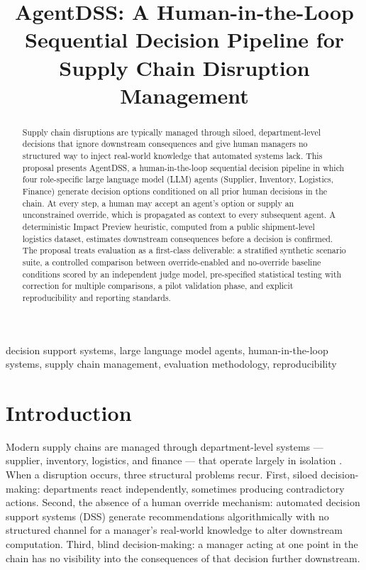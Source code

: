 \documentclass[conference]{IEEEtran}
\begin{document}
\title{AgentDSS: A Human-in-the-Loop Sequential Decision Pipeline for Supply Chain Disruption Management}

\author{}

\maketitle

\begin{abstract}
Supply chain disruptions are typically managed through siloed, department-level decisions that ignore downstream consequences and give human managers no structured way to inject real-world knowledge that automated systems lack. This proposal presents AgentDSS, a human-in-the-loop sequential decision pipeline in which four role-specific large language model (LLM) agents (Supplier, Inventory, Logistics, Finance) generate decision options conditioned on all prior human decisions in the chain. At every step, a human may accept an agent's option or supply an unconstrained override, which is propagated as context to every subsequent agent. A deterministic Impact Preview heuristic, computed from a public shipment-level logistics dataset, estimates downstream consequences before a decision is confirmed. The proposal treats evaluation as a first-class deliverable: a stratified synthetic scenario suite, a controlled comparison between override-enabled and no-override baseline conditions scored by an independent judge model, pre-specified statistical testing with correction for multiple comparisons, a pilot validation phase, and explicit reproducibility and reporting standards.
\end{abstract}

\begin{IEEEkeywords}
decision support systems, large language model agents, human-in-the-loop systems, supply chain management, evaluation methodology, reproducibility
\end{IEEEkeywords}

\section{Introduction}
Modern supply chains are managed through department-level systems --- supplier, inventory, logistics, and finance --- that operate largely in isolation \cite{power2002}. When a disruption occurs, three structural problems recur. First, siloed decision-making: departments react independently, sometimes producing contradictory actions. Second, the absence of a human override mechanism: automated decision support systems (DSS) generate recommendations algorithmically with no structured channel for a manager's real-world knowledge to alter downstream computation. Third, blind decision-making: a manager acting at one point in the chain has no visibility into the consequences of that decision further downstream.
\end{document}
